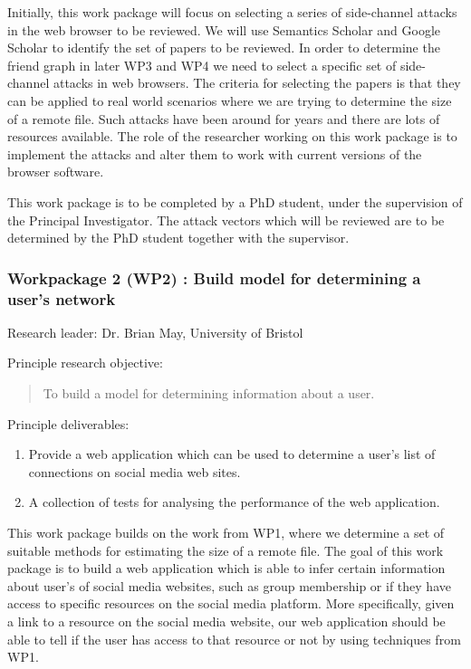 \documentclass[a4paper,11pt]{article}
\begin{document}
Initially, this work package will focus on selecting a series of side-channel attacks in the web browser to be reviewed. We will use Semantics Scholar \cite{semanticsearch} and Google Scholar\cite{googlescholar} to identify the set of papers to be reviewed. In order to determine the friend graph in later WP3 and WP4 we need to select a specific set of side-channel attacks in web browsers. The criteria for selecting the papers is that they can be applied to real world scenarios where we are trying to determine the size of a remote file. Such attacks have been around for years and there are lots of resources available. The role of the researcher working on this work package is to implement the attacks and alter them to work with current versions of the browser software. 

This work package is to be completed by a PhD student, under the supervision of the Principal Investigator. The attack vectors which will be reviewed are to be determined by the PhD student together with the supervisor.


\subsubsection*{Workpackage 2 (WP2) : Build model for determining a user's network}
Research leader: Dr. Brian May, University of Bristol

Principle research objective:
\begin{quote}
	To build a model for determining information about a user.
\end{quote}

Principle deliverables:
\begin{enumerate}
\item Provide a web application which can be used to determine a user's list of connections on social media web sites.
\item A collection of tests for analysing the performance of the web application.
\end{enumerate}

This work package builds on the work from WP1, where we determine a set of suitable methods for estimating the size of a remote file. The goal of this work package is to build a web application which is able to infer certain information about user's of social media websites, such as group membership or if they have access to specific resources on the social media platform. More specifically, given a link to a resource on the social media website, our web application should be able to tell if the user has access to that resource or not by using techniques from WP1.
\end{document}
